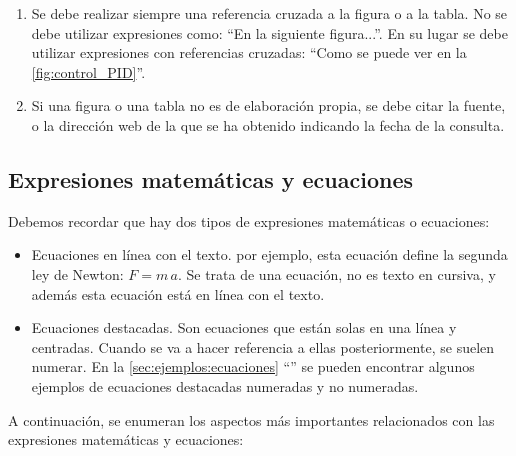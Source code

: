 \documentclass[11pt]{article}
\begin{document}
\begin{enumerate}
    \item Se debe realizar siempre una referencia cruzada a la figura o a la tabla. No se debe utilizar expresiones como: ``En la siguiente figura...''. En su lugar se debe utilizar expresiones con referencias cruzadas: ``Como se puede ver en la \autoref{fig:control_PID}''.

    \item Si una figura o una tabla no es de elaboración propia, se debe citar la fuente, o la dirección web de la que se ha obtenido indicando la fecha de la consulta.
    
\end{enumerate}

\subsection{Expresiones matemáticas y ecuaciones}

Debemos recordar que hay dos tipos de expresiones matemáticas o ecuaciones:

\begin{itemize}

    \item Ecuaciones en línea con el texto. por ejemplo, esta ecuación define la segunda ley de Newton: $F = m\,a$. Se trata de una ecuación, no es texto en cursiva, y además esta ecuación está en línea con el texto.
	
	\item Ecuaciones destacadas. Son ecuaciones que están solas en una línea y centradas. Cuando se va a hacer referencia a ellas posteriormente, se suelen numerar. En la \autoref{sec:ejemplos:ecuaciones} ``'' se pueden encontrar algunos ejemplos de ecuaciones destacadas numeradas y no numeradas.
	
\end{itemize}

A continuación, se enumeran los aspectos más importantes relacionados con las expresiones matemáticas y ecuaciones:
\end{document}
